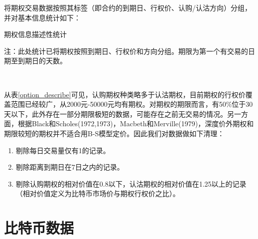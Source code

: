 \par{
将期权交易数据按照其标签（即合约的到期日、行权价、认购/认沽方向）分组，并对基本信息统计如下：
}
\par{
\begin{center}
\begin{threeparttable}[H]
\centering
\caption{期权信息描述性统计}
\label{option_describe}

\begin{tablenotes}
\footnotesize
\item 注：此处统计已将期权按照到期日、行权价和方向分组。期限为第一个有交易的日期至到期日的天数。
\end{tablenotes}
\end{threeparttable}
\end{center}
}
~\\
\par{
从表\ref{option_describe}可见，认购期权种类略多于认沽期权，目前期权的行权价覆盖范围已经较广，从2000元-50000元均有期权。对期权的期限而言，有50$\%$位于30天以下，此外存在一部分期限极短的数据，可能存在之前无交易的情况。另一方面，根据Black和Scholes(1972,1973)\cite{J-1972}\cite{10.2307/1831029}，Macbeth和Merville(1979)\cite{Jame-1979}，深度价外期权和期限较短的期权并不适合用B-S模型定价。因此我们对数据做如下清理：
\begin{enumerate}[(1)]
    \item 剔除每日交易量仅有1的记录。
    \item 剔除距离到期日在7日之内的记录。
    \item 剔除认购期权的相对价值在0.8以下，认沽期权的相对价值在1.25以上的记录（相对价值定义为比特币市场价与期权行权价之比）。
    
\end{enumerate}
}
\section{比特币数据}

